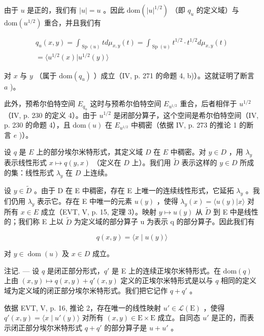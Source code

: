 由于 \(u\) 是正的，我们有 \(|u| = u\) 。因此 \(\mathrm{dom}(|u|^{1/2})\) （即 \(q_u\) 的定义域）与 \(\mathrm{dom}(u^{1/2})\) 重合，并且我们有

\[
\begin{array}{c} q _ {u} (x, y) = \int_ {\operatorname{Sp} (u)} t d \mu_ {x, y} (t) = \int_ {\operatorname{Sp} (u)} t ^ {1 / 2} \cdot t ^ {1 / 2} d \mu_ {x, y} (t) \\ = \langle u ^ {1 / 2} (x) | u ^ {1 / 2} (y) \rangle \end{array}
\]

对 \(x\) 与 \(y\) （属于 \(\mathrm{dom}(q_u)\) ）成立（IV, p. 271 的命题 4, b)）。这就证明了断言 \(a\) )。

此外，预希尔伯特空间 \(E_{q_{u}}\) 这时与预希尔伯特空间 \(E_{u^{1/2}}\) 重合，后者相伴于 \(u^{1/2}\) （IV, p. 230 的定义 4）。由于 \(u^{1/2}\) 是闭部分算子，这个空间是希尔伯特空间（IV, p. 230 的命题 4），且 \(\text{dom}(u)\) 在 \(E_{u^{1/2}}\) 中稠密（依据 IV, p. 273 的推论 1 的断言 \(e\) )）。

设 \(q\) 是 \(E\) 上的部分埃尔米特形式，其定义域 \(D\) 在 \(E\) 中稠密。对 \(y \in D\) ，用 \(\lambda_y\) 表示线性形式 \(x \mapsto q(y, x)\) （定义在 \(D\) 上）。我们用 \(\widetilde{D}\) 表示这样的 \(y \in D\) 所成的集：线性形式 \(\lambda_y\) 在 \(D\) 上连续。

设 \(y \in \widetilde{D}\) 。由于 D 在 E 中稠密，存在 E 上唯一的连续线性形式，它延拓 \(\lambda_{y}\) 。我们仍用 \(\lambda_{y}\) 表示它。存在 E 中唯一的元素 \(u(y)\) ，使得 \(\lambda_{y}(x) = \langle u(y) | x \rangle\) 对所有 \(x \in E\) 成立（EVT, V, p. 15, 定理 3）。映射 \(y \mapsto u(y)\) 从 \(\widetilde{D}\) 到 E 中是线性的；我们称 E 上以 \(\widetilde{D}\) 为定义域的部分算子 u 为表示 q 的部分算子。因此我们有

\[
q (x, y) = \langle x \mid u (y) \rangle
\]

对 \(y \in \operatorname{dom}(u)\) 及 \(x \in D\) 成立。

注记. --- 设 \(q\) 是闭正部分形式，\(q'\) 是 E 上的连续正埃尔米特形式。在 \(\text{dom}(q)\) 上由 \((x, y) \mapsto q(x, y) + q'(x, y)\) 定义的正埃尔米特形式是以与 \(q\) 相同的定义域为定义域的闭正部分埃尔米特形式。我们把它记作 \(q + q'\) 。

依据 EVT, V, p. 16, 推论 2，存在唯一的线性映射 \(u' \in \mathcal{L}(\mathrm{E})\) ，使得 \(q'(x,y) = \langle x \mid u'(y) \rangle\) 对所有 \((x,y) \in \mathrm{E} \times \mathrm{E}\) 成立。自同态 \(u'\) 是正的，而表示闭正部分埃尔米特形式 \(q + q'\) 的部分算子是 \(u + u'\) 。

